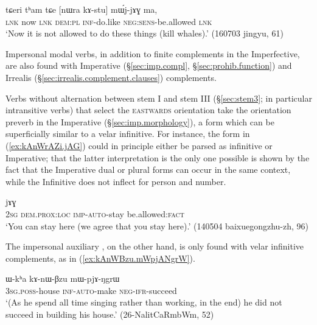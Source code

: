\begin{exe} 
\ex \label{ex:kAstu.mWjjAG}
\gll tɕeri tʰam tɕe [nɯra kɤ-stu] mɯ́j-jɤɣ ma,  \\
\textsc{lnk} now \textsc{lnk} \textsc{dem}:\textsc{pl} \textsc{inf}-do.like \textsc{neg}:\textsc{sens}-be.allowed \textsc{lnk} \\
\glt `Now it is not allowed to do these things (kill whales).' (160703 jingyu, 61)
\end{exe} 

Impersonal modal verbs, in addition to finite complements in the Imperfective, are also found with Imperative (§\ref{sec:imp.compl}, §\ref{sec:prohib.function}) and Irrealis (§\ref{sec:irrealis.complement.clauses}) complements. 


Verbs without alternation between stem I and stem III (§\ref{sec:stem3}; in particular intransitive verbs) that select the \textsc{eastwards} orientation take the  orientation preverb in the Imperative (§\ref{sec:imp.morphology}), a form which can be superficially similar to a velar infinitive. For instance, the form  in (\ref{ex:kAnWrAZi.jAG}) could in principle either be parsed as infinitive or Imperative; that the latter interpretation is the only one possible is shown by the fact that the Imperative dual  or plural  forms can occur in the same context, while the Infinitive does not inflect for person and number.


\begin{exe} 
\ex \label{ex:kAnWrAZi.jAG}
 jɤɣ \\
\textsc{2sg} \textsc{dem}.\textsc{prox}:\textsc{loc} \textsc{imp}-\textsc{auto}-stay be.allowed:\textsc{fact} \\
\glt `You can stay here (we agree that you stay here).' (140504 baixuegongzhu-zh, 96)
\end{exe}

The impersonal auxiliary , on the other hand, is only found with velar infinitive complements, as in (\ref{ex:kAnWBzu.mWpjANgrW}).

\begin{exe} 
\ex \label{ex:kAnWBzu.mWpjANgrW}
\gll ɯ-kʰa kɤ-nɯ-βzu mɯ-pjɤ-ŋgrɯ \\
\textsc{3sg}.\textsc{poss}-house \textsc{inf}-\textsc{auto}-make \textsc{neg}-\textsc{ifr}-succeed \\
\glt `(As he spend all time singing rather than working, in the end) he did not succeed in building his house.' (26-NalitCaRmbWm, 52)
\end{exe}


